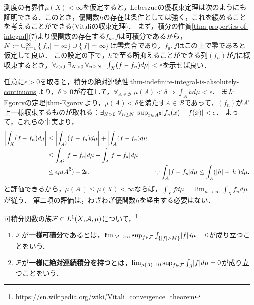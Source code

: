 \documentclass[uplatex, dvipdfmx]{jsreport}
\renewcommand{\B}{\mathcal{B}}
\begin{document}
\begin{discussion}
    測度の有界性$\mu(X)<\infty$を仮定すると，Lebesgueの優収束定理は次のようにも証明できる．このとき，優関数$h$の存在は条件としては強く，これを緩めることを考えることができる(Vitaliの収束定理)．
    まず，積分の性質\ref{thm-properties-of-integral}(7)より優関数の存在する$f_n,f$は可積分であるから，$N:=\cup^\infty_{n=1}\left\{\lvert f_n\rvert=\infty\right\}\cup\{\lvert f\rvert=\infty\}$は零集合であり，$f_n,f$はこの上で零であると仮定して良い．
    この設定の下で，$h$で至る所抑えることができる列$(f_n)$が$f$に概収束するとき，$\forall_{\epsilon>0}\;\exists_{N>0}\;\forall_{n\ge N}\;\left|\int_X(f-f_n)d\mu\right|<\epsilon$を示せば良い．

    任意に$\epsilon>0$を取ると，積分の絶対連続性\ref{thm-indefinite-integral-is-absolutely-continuous}より，$\delta>0$が存在して，$\forall_{A\in\B}\;\mu(A)<\delta\Rightarrow\int_Ahd\mu<\epsilon$．
    またEgorovの定理\ref{thm-Egorov}より，$\mu(A)<\delta$を満たす$A\in\B$であって，$(f_n)$が$A^\comp$上一様収束するものが取れる：$\exists_{N>0}\;\forall_{n\ge N}\;\sup_{x\in A^\complement}\lvert f_n(x)-f(x)\rvert<\epsilon$．
    よって，これらの事実より，
    \begin{align*}
        \left|\int_X(f-f_n)d\mu\right|&\le\left|\int_{A^\complement}(f-f_n)d\mu\right|+\left|\int_A(f-f_n)d\mu\right|\\
        &\le\int_{A^\complement}\lvert f-f_n\rvert d\mu+\int_A\lvert f-f_n\rvert d\mu\\
        &\le\epsilon\mu(A^\complement)+2\epsilon.&\because \int_A\lvert f-f_n\rvert d\mu\le\int_A(\lvert h\rvert+\lvert h\rvert)d\mu.
    \end{align*}
    と評価できるから，$\mu(A^\comp)\le\mu(X)<\infty$ならば，$\int_Xfd\mu=\lim_{n\to\infty}\int_Xf_nd\mu$が従う．
    第二項の評価は，わざわざ優関数$h$を経由する必要はない．
\end{discussion}

\begin{definition}
    可積分関数の族$\mathcal{F}\subset L^1(X,\mathcal{A},\mu)$について，\footnote{\url{https://en.wikipedia.org/wiki/Vitali_convergence_theorem}}
    \begin{enumerate}
        \item $\mathcal{F}$が\textbf{一様可積分}であるとは，$\lim_{M\to\infty}\sup_{f\in\mathcal{F}}\int_{\left\{\lvert f\rvert>M\right\}}\lvert f\rvert d\mu=0$が成り立つことをいう．
        \item $\mathcal{F}$が\textbf{一様に絶対連続積分を持つ}とは，$\lim_{\mu(A)\to 0}\sup_{f\in\mathcal{F}}\int_A\lvert f\rvert d\mu=0$が成り立つことをいう．
    \end{enumerate}
\end{definition}
\end{document}
